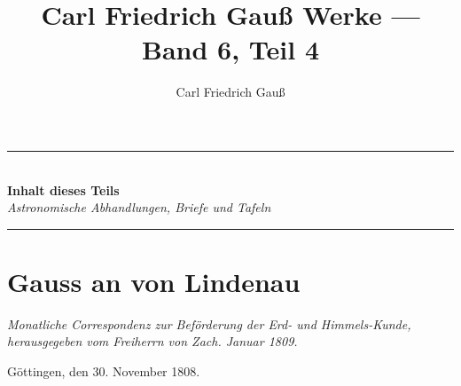 \documentclass[10pt,a4paper]{article}
\begin{document}
\title{Carl Friedrich Gauß Werke --- Band 6, Teil 4}
\author{Carl Friedrich Gauß}
\date{}
\maketitle

\thispagestyle{fancy}

\begin{center}
\rule{0.8\textwidth}{0.5pt}\\[1em]
\textbf{Inhalt dieses Teils}\\[0.5em]
\textit{Astronomische Abhandlungen, Briefe und Tafeln}\\[0.5em]
\rule{0.8\textwidth}{0.5pt}
\end{center}

\vspace{1em}

\section*{Gauss an von Lindenau}
\label{sec:lindenau}

\begin{center}
\small
\textit{Monatliche Correspondenz zur Beförderung der Erd- und Himmels-Kunde,}\\
\textit{herausgegeben vom Freiherrn von Zach. Januar 1809.}
\end{center}

\vspace{0.5em}
\noindent
Göttingen, den 30. November 1808.
\end{document}
